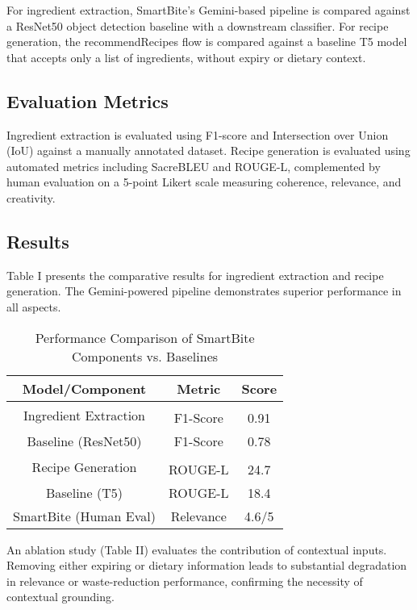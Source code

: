 \documentclass[conference]{IEEEtran}
\begin{document}
For ingredient extraction, SmartBite's Gemini-based pipeline is compared against a ResNet50 object detection baseline with a downstream classifier. For recipe generation, the recommendRecipes flow is compared against a baseline T5 model that accepts only a list of ingredients, without expiry or dietary context.

\subsection{Evaluation Metrics}

Ingredient extraction is evaluated using F1-score and Intersection over Union (IoU) against a manually annotated dataset. Recipe generation is evaluated using automated metrics including SacreBLEU and ROUGE-L, complemented by human evaluation on a 5-point Likert scale measuring coherence, relevance, and creativity.

\subsection{Results}

Table I presents the comparative results for ingredient extraction and recipe generation. The Gemini-powered pipeline demonstrates superior performance in all aspects.

\begin{table}[h]
  \centering
  \caption{Performance Comparison of SmartBite Components vs. Baselines}
  \label{tab:results}
  \begin{tabular}{|c|c|c|}
    \hline
    \textbf{Model/Component} & \textbf{Metric} & \textbf{Score} \\
    \hline
    \multirow{2}{*}{Ingredient Extraction} & & \\
    & F1-Score & 0.91 \\
    Baseline (ResNet50) & F1-Score & 0.78 \\
    \hline
    \multirow{2}{*}{Recipe Generation} & & \\
    & ROUGE-L & 24.7 \\
    Baseline (T5) & ROUGE-L & 18.4 \\
    SmartBite (Human Eval) & Relevance & 4.6/5 \\
    \hline
  \end{tabular}
\end{table}

An ablation study (Table II) evaluates the contribution of contextual inputs. Removing either expiring or dietary information leads to substantial degradation in relevance or waste-reduction performance, confirming the necessity of contextual grounding.
\end{document}
